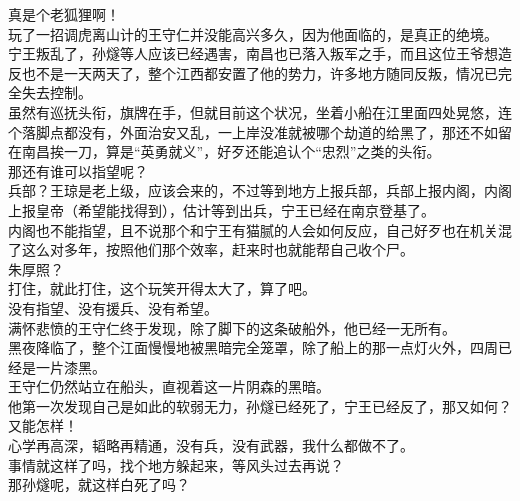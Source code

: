 \begin{multicols}{\theparacolNo}
真是个老狐狸啊！\\

玩了一招调虎离山计的王守仁并没能高兴多久，因为他面临的，是真正的绝境。\\

宁王叛乱了，孙燧等人应该已经遇害，南昌也已落入叛军之手，而且这位王爷想造反也不是一天两天了，整个江西都安置了他的势力，许多地方随同反叛，情况已完全失去控制。\\

虽然有巡抚头衔，旗牌在手，但就目前这个状况，坐着小船在江里面四处晃悠，连个落脚点都没有，外面治安又乱，一上岸没准就被哪个劫道的给黑了，那还不如留在南昌挨一刀，算是“英勇就义”，好歹还能追认个“忠烈”之类的头衔。\\

那还有谁可以指望呢？\\

兵部？王琼是老上级，应该会来的，不过等到地方上报兵部，兵部上报内阁，内阁上报皇帝（希望能找得到），估计等到出兵，宁王已经在南京登基了。\\

内阁也不能指望，且不说那个和宁王有猫腻的人会如何反应，自己好歹也在机关混了这么对多年，按照他们那个效率，赶来时也就能帮自己收个尸。\\

朱厚照？\\

打住，就此打住，这个玩笑开得太大了，算了吧。\\

没有指望、没有援兵、没有希望。\\

满怀悲愤的王守仁终于发现，除了脚下的这条破船外，他已经一无所有。\\

黑夜降临了，整个江面慢慢地被黑暗完全笼罩，除了船上的那一点灯火外，四周已经是一片漆黑。\\

王守仁仍然站立在船头，直视着这一片阴森的黑暗。\\

他第一次发现自己是如此的软弱无力，孙燧已经死了，宁王已经反了，那又如何？又能怎样！\\

心学再高深，韬略再精通，没有兵，没有武器，我什么都做不了。\\

事情就这样了吗，找个地方躲起来，等风头过去再说？\\

那孙燧呢，就这样白死了吗？\\


\end{multicols}
